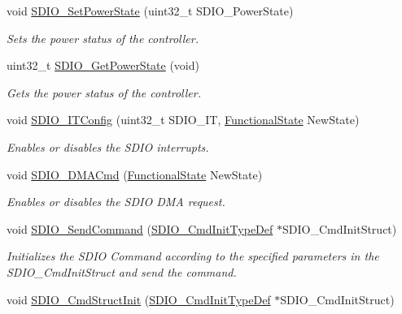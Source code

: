 \begin{DoxyCompactItemize}
void \mbox{\hyperlink{group___s_d_i_o___exported___functions_ga36ecca32b904de74218fbe65cd5f5270}{S\+D\+I\+O\+\_\+\+Set\+Power\+State}} (uint32\+\_\+t S\+D\+I\+O\+\_\+\+Power\+State)
\begin{DoxyCompactList}\small\item\em Sets the power status of the controller. \end{DoxyCompactList}\item 
uint32\+\_\+t \mbox{\hyperlink{group___s_d_i_o___exported___functions_ga3a19de2c7cd51645702213f64a1758ed}{S\+D\+I\+O\+\_\+\+Get\+Power\+State}} (void)
\begin{DoxyCompactList}\small\item\em Gets the power status of the controller. \end{DoxyCompactList}\item 
void \mbox{\hyperlink{group___s_d_i_o___exported___functions_ga208f51237ef43288735829dbaed37f00}{S\+D\+I\+O\+\_\+\+I\+T\+Config}} (uint32\+\_\+t S\+D\+I\+O\+\_\+\+IT, \mbox{\hyperlink{group___exported__types_gac9a7e9a35d2513ec15c3b537aaa4fba1}{Functional\+State}} New\+State)
\begin{DoxyCompactList}\small\item\em Enables or disables the S\+D\+IO interrupts. \end{DoxyCompactList}\item 
void \mbox{\hyperlink{group___s_d_i_o___exported___functions_gad36fde5ec0ce0c2089b9d971c2271e6e}{S\+D\+I\+O\+\_\+\+D\+M\+A\+Cmd}} (\mbox{\hyperlink{group___exported__types_gac9a7e9a35d2513ec15c3b537aaa4fba1}{Functional\+State}} New\+State)
\begin{DoxyCompactList}\small\item\em Enables or disables the S\+D\+IO D\+MA request. \end{DoxyCompactList}\item 
void \mbox{\hyperlink{group___s_d_i_o___exported___functions_ga7117d2f702703f6c0a66bc07707cab23}{S\+D\+I\+O\+\_\+\+Send\+Command}} (\mbox{\hyperlink{struct_s_d_i_o___cmd_init_type_def}{S\+D\+I\+O\+\_\+\+Cmd\+Init\+Type\+Def}} $\ast$S\+D\+I\+O\+\_\+\+Cmd\+Init\+Struct)
\begin{DoxyCompactList}\small\item\em Initializes the S\+D\+IO Command according to the specified parameters in the S\+D\+I\+O\+\_\+\+Cmd\+Init\+Struct and send the command. \end{DoxyCompactList}\item 
void \mbox{\hyperlink{group___s_d_i_o___exported___functions_ga09d9e89f49c87c82aec79c97b7068e24}{S\+D\+I\+O\+\_\+\+Cmd\+Struct\+Init}} (\mbox{\hyperlink{struct_s_d_i_o___cmd_init_type_def}{S\+D\+I\+O\+\_\+\+Cmd\+Init\+Type\+Def}} $\ast$S\+D\+I\+O\+\_\+\+Cmd\+Init\+Struct)

\end{DoxyCompactItemize}
